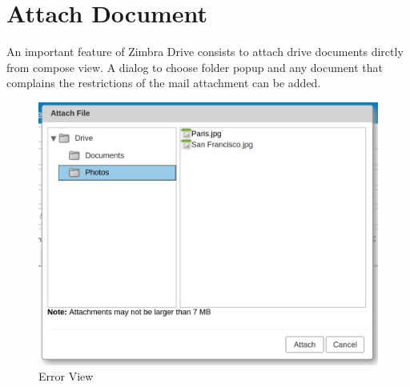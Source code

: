 \section{Attach Document}
An important feature of Zimbra Drive consists to attach drive documents dirctly from compose view.
A dialog to choose folder popup and any document that complains the restrictions of the mail attachment can be added.\\
\begin{figure}[htbp,!h] 
\centering 
\includegraphics[scale=0.25]{src/images/ZD-attachDialog.png} 
\caption{Error View} 
\label{==fig:errUnreachable==}
\end{figure}